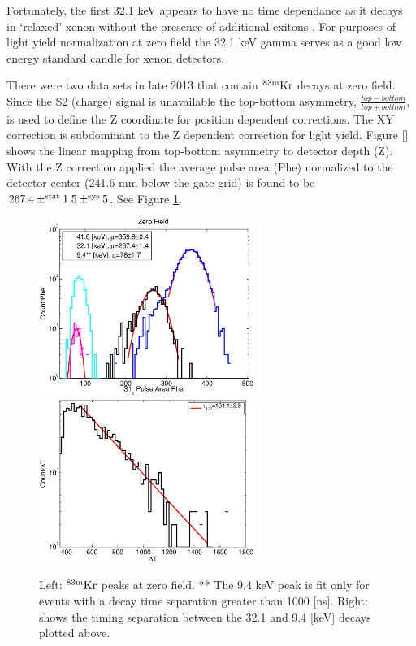 Fortunately, the first 32.1 keV appears to have no time dependance as it decays in `relaxed' xenon without the presence of additional exitons \cite{Aprile_LY}. For purposes of light yield normalization at zero field the 32.1 keV gamma serves as a good low energy standard candle for xenon detectors.

There were two data sets in late 2013 that contain $\rm^{83m}Kr$ decays at zero field. Since the S2 (charge) signal is unavailable the top-bottom asymmetry, $\frac{top-bottom}{top+bottom} $, is used to define the Z coordinate for position dependent corrections. The XY correction is subdominant to the Z dependent correction for light yield. Figure [] shows the linear mapping from top-bottom asymmetry to detector depth (Z). With the Z correction applied the average pulse area (Phe) normalized to the detector center (241.6 mm below the gate grid) is found to be $\rm 267.4 \pm^{stat} 1.5 \pm^{sys} 5$. See Figure \ref{fig:ZeroField_Kr}.

 
 \begin{figure}[h!]\centering
\includegraphics[width=70mm]{Recombination_LY_QY/Figures/S1_Z_no_field_lux10_20131009T1358_cp06914}
\includegraphics[width=70mm]{Recombination_LY_QY/Figures/dT_no_field_2lux10_20131009T1358_cp06914}
\caption{Left: $\rm^{83m}Kr$ peaks at zero field. ** The 9.4 keV peak is fit only for events with a decay time separation greater than 1000 [ns]. Right: shows the timing separation between the 32.1 and 9.4 [keV] decays plotted above.}
\label{fig:ZeroField_Kr}
\end{figure}
 
